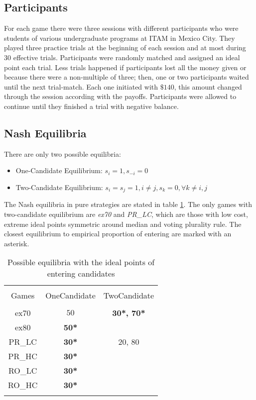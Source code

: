 \subsection{Participants}

For each game there were three sessions with different participants who were students of various undergraduate programs at ITAM in Mexico City. They played three practice trials at the beginning of each session and at most during 30 effective trials.
Participants were randomly matched and assigned an ideal point each trial. 
Less trials happened if participants lost all the money given or because there were a non-multiple of three; then, one or two participants waited until the next trial-match. 
Each one initiated with $\$140$, this amount changed through the session according with the payoffs. Participants were allowed to continue until they finished a trial with negative balance. 

\subsection{Nash Equilibria}

There are only two possible equilibria:

\begin{itemize}
	\item One-Candidate Equilibrium:
		$s_i=1, s_{-i}=0$
	\item Two-Candidate Equilibrium:
		$s_i=s_j=1, i \neq j, s_{k}=0, \forall k\neq i,j$
\end{itemize}

The Nash equilibria in pure strategies are stated in table \ref{tab:equilibria}. The only games with two-candidate equilibrium are \emph{ex70} and \emph{PR\_LC}, which are those with low cost, extreme ideal points symmetric around median and voting  plurality rule. The closest equilibrium to empirical proportion of entering are marked with an asterisk. 

\begin{table}[!htbp] \centering 
	\caption{Possible equilibria with the ideal points of entering candidates}
	\label{tab:equilibria} 
	\begin{tabular}{@{\extracolsep{5pt}} ccc} 
		\\[-1.8ex]\hline 
		\hline \\[-1.8ex] 
		Games & OneCandidate & TwoCandidate \\ 
		\hline \\[-1.8ex] 
		ex70 & $50$ & \textbf{30*, 70*} \\ 
		ex80 & \textbf{50*} &  \\ 
		PR\_LC & \textbf{30*} & $20$, $80$ \\ 
		PR\_HC & \textbf{30*} &  \\ 
		RO\_LC & \textbf{30*} &  \\ 
		RO\_HC & \textbf{30*} &  \\ 
		\hline \\[-1.8ex] 
	\end{tabular} 
\end{table} 

